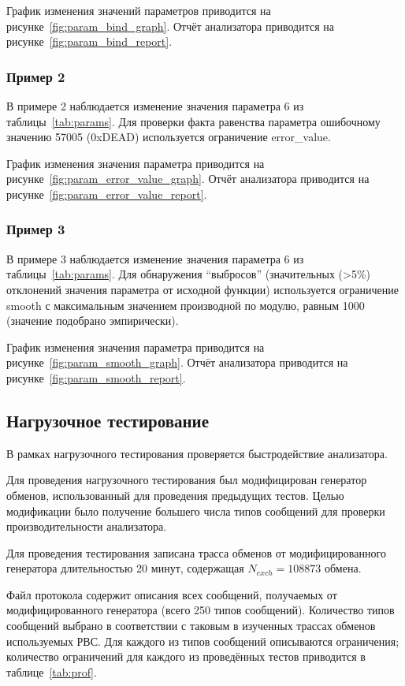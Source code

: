 График изменения значений параметров 
приводится на рисунке~\ref{fig:param_bind_graph}. Отчёт анализатора приводится 
на рисунке~\ref{fig:param_bind_report}.

\subsubsection{Пример 2}

В примере 2 наблюдается изменение значения параметра 6 из 
таблицы~\ref{tab:params}. Для проверки факта равенства параметра ошибочному 
значению 57005 (0xDEAD) используется ограничение error\_value.

График изменения значения параметра 
приводится на рисунке~\ref{fig:param_error_value_graph}. Отчёт анализатора 
приводится на рисунке~\ref{fig:param_error_value_report}.

\subsubsection{Пример 3}

В примере 3 наблюдается изменение значения параметра 6 из 
таблицы~\ref{tab:params}. Для обнаружения ``выбросов'' (значительных (>5\%)
отклонений значения параметра от исходной функции) используется ограничение 
smooth с максимальным значением производной по модулю, равным 1000 (значение 
подобрано эмпирически).

График изменения значения параметра 
приводится на рисунке~\ref{fig:param_smooth_graph}. Отчёт анализатора 
приводится на рисунке~\ref{fig:param_smooth_report}.

\subsection{Нагрузочное тестирование}

В рамках нагрузочного тестирования проверяется быстродействие анализатора.

Для проведения нагрузочного тестирования был модифицирован генератор обменов, 
использованный для проведения предыдущих тестов. Целью модификации было 
получение большего числа типов сообщений для проверки производительности 
анализатора.

Для проведения тестирования записана трасса обменов от 
модифицированного генератора длительностью 20 минут, содержащая $N_{exch} 
= 108873$ обмена. 

Файл протокола содержит описания всех сообщений, получаемых от 
модифицированного генератора (всего 250 типов сообщений). Количество типов 
сообщений выбрано в соответствии с таковым в изученных трассах обменов 
используемых РВС. Для каждого из типов сообщений описываются ограничения; 
количество ограничений для каждого из проведённых тестов приводится в 
таблице~\ref{tab:prof}.

